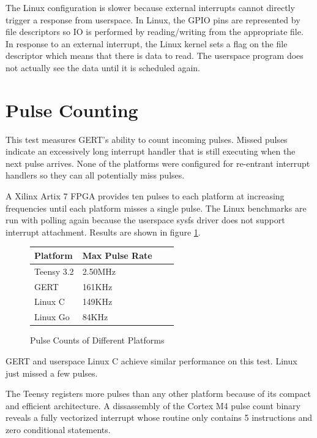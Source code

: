 The Linux configuration is slower because external interrupts cannot directly trigger a response
from userspace. In Linux, the GPIO pins are represented by file descriptors so
IO is performed by reading/writing from the appropriate file. In response to an external interrupt,
the Linux kernel sets a flag on the file descriptor which means that there is data to read. The userspace
program does not actually see the data until it is scheduled again.



\section{Pulse Counting}\label{sec:pulse_count}
This test measures GERT's ability to count incoming pulses. Missed pulses
indicate an excessively long interrupt handler that is still executing when the next
pulse arrives. None of the platforms were configured for re-entrant interrupt handlers
so they can all potentially miss pulses.

A Xilinx Artix 7 FPGA provides ten pulses to each platform at increasing frequencies
until each platform misses a single pulse. The Linux benchmarks are run with polling
again because the
userspace sysfs driver does not support interrupt attachment.
Results are shown in figure \ref{fig:counter}.


\begin{figure} [h]
\begin{center}
  \begin{tabular}{ | l | l | l | l |}
    \hline
    Platform & Max Pulse Rate \\ \hline
    Teensy 3.2 & 2.50MHz\\ \hline
    GERT & 161KHz\\ \hline
    Linux C & 149KHz\\ \hline
    Linux Go & 84KHz\\
    \hline
  \end{tabular}
\end{center}
  \caption{Pulse Counts of Different Platforms}  \label{fig:counter}
\end{figure}

GERT and userspace Linux C achieve similar performance on this test.
Linux just missed a few pulses.

The Teensy registers more pulses than any other platform because of its
compact and efficient architecture. A dissassembly of the Cortex M4 pulse count binary
reveals a fully vectorized interrupt whose routine only contains 5
instructions and zero conditional statements.

